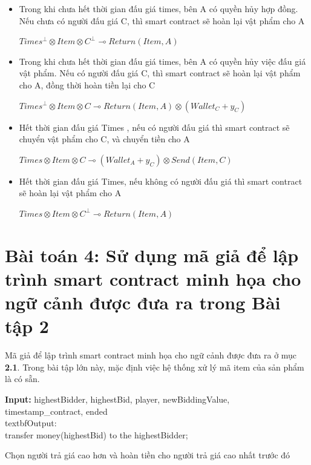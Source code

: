 \documentclass[a4paper]{article}
\begin{document}
\begin{itemize}
    \item Trong khi chưa hết thời gian đấu giá times, bên A có quyền hủy hợp đồng. Nếu chưa có người đấu giá C, thì smart contract sẽ hoàn lại vật phẩm cho A
    \begin{center}
        $Times^{\bot} \otimes Item \otimes C^{\bot} \multimap Return(Item,A)$
    \end{center}
    
    \item Trong khi chưa hết thời gian đấu giá times, bên A có quyền hủy việc đấu giá vật phẩm. Nếu có người đấu giá C, thì smart contract sẽ hoàn lại vật phẩm cho A, đồng thời hoàn tiền lại cho C\\
    \begin{center}
        $Times^{\bot} \otimes Item \otimes C \multimap Return(Item, A) \otimes (Wallet_{C} + y_{C})$ 
    \end{center}
    
    \item Hết thời gian đấu giá Times , nếu có người đấu giá thì smart contract sẽ chuyển vật phẩm cho C, và chuyển tiền cho A\\
    \begin{center}
        $Times \otimes Item \otimes C \multimap (Wallet_{A} + y_{C}) \otimes Send(Item,C)$
    \end{center}
    
    \item Hết thời gian đấu giá Times, nếu không có người đấu giá thì smart contract sẽ hoàn lại vật phẩm cho A\\
    \begin{center}
        $Times \otimes Item \otimes C^{\bot} \multimap Return(Item,A)$
    \end{center}
\end{itemize}

\section{Bài toán 4: Sử dụng mã giả để lập trình smart contract minh họa cho ngữ cảnh được đưa ra
trong Bài tập 2}
Mã giả để lập trình smart contract minh họa cho ngữ cảnh được đưa ra ở mục \textbf{2.1}. Trong bài tập lớn này, mặc định việc hệ thống xử lý mã item của sản phẩm là có sẵn.\\



\begin{algorithm}
 \textbf{Input:} highestBidder, highestBid, player, newBiddingValue, timestamp\_contract, ended\\
 textbf{Output:}\\
 
    {
        {
            {
                \State transfer money(highestBid) to the highestBidder;
            }
            \EndIf
        }
        \EndIf
    }
    \EndIf
    
 \caption{Chọn người trả giá cao hơn và hoàn tiền cho người trả giá cao nhất trước đó}
\end{algorithm}
\end{document}
